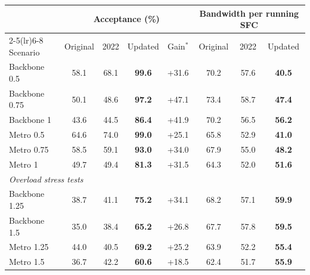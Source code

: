 \begin{tabular}{lccccccc}
\toprule
 & \multicolumn{4}{c}{Acceptance (\%)} & \multicolumn{3}{c}{Bandwidth per running SFC} \\
\cmidrule(lr){2-5}\cmidrule(lr){6-8}
Scenario & Original & 2022 & Updated & Gain$^\ast$ & Original & 2022 & Updated \\
\midrule
Backbone 0.5 & 58.1 & 68.1 & \textbf{99.6} & +31.6 & 70.2 & 57.6 & \textbf{40.5} \\
Backbone 0.75 & 50.1 & 48.6 & \textbf{97.2} & +47.1 & 73.4 & 58.7 & \textbf{47.4} \\
Backbone 1 & 43.6 & 44.5 & \textbf{86.4} & +41.9 & 70.2 & 56.5 & \textbf{56.2} \\
Metro 0.5 & 64.6 & 74.0 & \textbf{99.0} & +25.1 & 65.8 & 52.9 & \textbf{41.0} \\
Metro 0.75 & 58.5 & 59.1 & \textbf{93.0} & +34.0 & 67.9 & 55.0 & \textbf{48.2} \\
Metro 1 & 49.7 & 49.4 & \textbf{81.3} & +31.5 & 64.3 & 52.0 & \textbf{51.6} \\
\midrule \multicolumn{8}{l}{\emph{Overload stress tests}} \\
Backbone 1.25 & 38.7 & 41.1 & \textbf{75.2} & +34.1 & 68.2 & 57.1 & \textbf{59.9} \\
Backbone 1.5 & 35.0 & 38.4 & \textbf{65.2} & +26.8 & 67.7 & 57.8 & \textbf{59.5} \\
Metro 1.25 & 44.0 & 40.5 & \textbf{69.2} & +25.2 & 63.9 & 52.2 & \textbf{55.4} \\
Metro 1.5 & 36.7 & 42.2 & \textbf{60.6} & +18.5 & 62.4 & 51.7 & \textbf{55.9} \\
\bottomrule
\end{tabular}